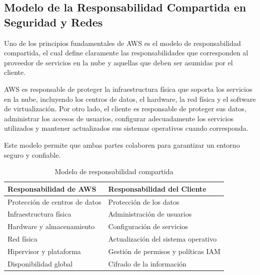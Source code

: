\documentclass[12pt,a4paper]{article}
\begin{document}
\subsection{Modelo de la Responsabilidad Compartida en Seguridad y Redes}

Uno de los principios fundamentales de AWS es el modelo de responsabilidad compartida, el cual define claramente las responsabilidades que corresponden al proveedor de servicios en la nube y aquellas que deben ser asumidas por el cliente.

AWS es responsable de proteger la infraestructura física que soporta los servicios en la nube, incluyendo los centros de datos, el hardware, la red física y el software de virtualización. Por otro lado, el cliente es responsable de proteger sus datos, administrar los accesos de usuarios, configurar adecuadamente los servicios utilizados y mantener actualizados sus sistemas operativos cuando corresponda.

Este modelo permite que ambas partes colaboren para garantizar un entorno seguro y confiable.

\begin{table}[H]
\centering
\caption{Modelo de responsabilidad compartida}
\begin{tabularx}{\textwidth}{XX}
\toprule
\textbf{Responsabilidad de AWS} & \textbf{Responsabilidad del Cliente}\\
\midrule
Protección de centros de datos & Protección de los datos\\

Infraestructura física & Administración de usuarios\\

Hardware y almacenamiento & Configuración de servicios\\

Red física & Actualización del sistema operativo\\

Hipervisor y plataforma & Gestión de permisos y políticas IAM\\

Disponibilidad global & Cifrado de la información\\
\bottomrule
\end{tabularx}
\end{table}
\end{document}
